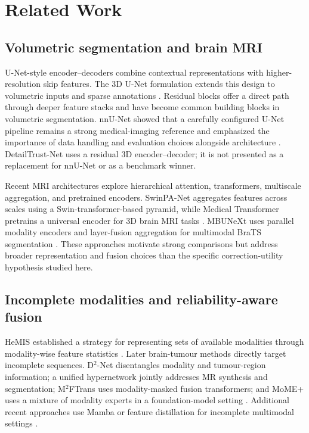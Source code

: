 \documentclass[conference]{IEEEtran}
\begin{document}
\section{Related Work}
\subsection{Volumetric segmentation and brain MRI}
U-Net-style encoder--decoders combine contextual representations with higher-resolution skip features. The 3D U-Net formulation extends this design to volumetric inputs and sparse annotations \cite{cicek2016}. Residual blocks offer a direct path through deeper feature stacks and have become common building blocks in volumetric segmentation. nnU-Net showed that a carefully configured U-Net pipeline remains a strong medical-imaging reference and emphasized the importance of data handling and evaluation choices alongside architecture \cite{isensee2021}. DetailTrust-Net uses a residual 3D encoder--decoder; it is not presented as a replacement for nnU-Net or as a benchmark winner.

Recent MRI architectures explore hierarchical attention, transformers, multiscale aggregation, and pretrained encoders. SwinPA-Net aggregates features across scales using a Swin-transformer-based pyramid, while Medical Transformer pretrains a universal encoder for 3D brain MRI tasks \cite{du2024swinpa,jun2024medtrans}. MBUNeXt uses parallel modality encoders and layer-fusion aggregation for multimodal BraTS segmentation \cite{liu2025mbunext}. These approaches motivate strong comparisons but address broader representation and fusion choices than the specific correction-utility hypothesis studied here.

\subsection{Incomplete modalities and reliability-aware fusion}
HeMIS established a strategy for representing sets of available modalities through modality-wise feature statistics \cite{havaei2016hemis}. Later brain-tumour methods directly target incomplete sequences. D$^2$-Net disentangles modality and tumour-region information; a unified hypernetwork jointly addresses MR synthesis and segmentation; M$^2$FTrans uses modality-masked fusion transformers; and MoME+ uses a mixture of modality experts in a foundation-model setting \cite{yang2022d2,yang2023hyper,shi2024m2f,zhang2025mome}. Additional recent approaches use Mamba or feature distillation for incomplete multimodal settings \cite{zhang2026m2seg,kang2026mamba}.
\end{document}
